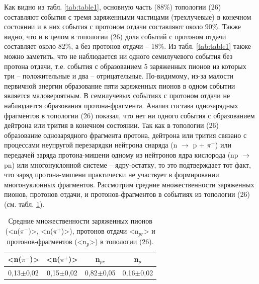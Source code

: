 \documentclass[fontsize=14pt]{scrreport}
\begin{document}
Как видно из табл. \ref{tab:table1}, основную часть (88\%) топологии (26) составляют события с тремя заряженными частицами (трехлучевые) в конечном состоянии и в них события с протоном отдачи составляют около 90\%. Также видно, что и в целом в топологии (26) доля событий с протоном отдачи составляет около 82\%, а без протонов отдачи – 18\%. Из табл. \ref{tab:table1} также можно заметить, что не наблюдается ни одного семилучевого события без протона отдачи, т.е. события с образованием 5 заряженных пионов из которых три – положительные и два – отрицательные. По-видимому, из-за малости первичной энергии образование пяти заряженных пионов в одном событии является маловероятным. В семилучевых событиях с протоном отдачи не наблюдается образования протона-фрагмента. Анализ состава однозарядных фрагментов в топологии (26) показал, что нет ни одного события с образованием дейтрона или трития в конечном состоянии. Так как в топологии (26) образование однозарядного фрагмента протона, дейтрона или трития связано с процессами неупругой перезарядки нейтрона снаряда (n $\rightarrow$ p + $\pi^{-}$) или передачей заряда протона-мишени одному из нейтронов ядра кислорода (np $\rightarrow$ pn) или многонуклонной системе – ядру-остатку, то это подтверждает тот факт, что заряд протона-мишени практически не участвует в формировании многонуклонных фрагментов\cite{44}. Рассмотрим средние множественности заряженных пионов, протонов отдачи, и протонов-фрагментов в событиях из топологии (26) (см. табл. \ref{tab:table2}).


\begin{table}
    \centering
    \begin{tabular}{|c|c|c|c|}
    \hline
       <n($\pi^{-}$)>  &<n($\pi^{+}$)> &n$_{pr}$&n$_{p}$ \\
       \hline
         0,13$\pm$0,02&	0,15$\pm$0,02&	0,82$\pm$0,05&	0,16$\pm$0,02\\
         \hline
    \end{tabular}
    \caption{Средние множественности заряженных пионов (<n($\pi^{-}$)>, <n($\pi^{+}$)>), протонов отдачи <n$_{pr}$> и протонов-фрагментов (<n$_{p}$>) в топологии (26).}
    \label{tab:table2}
\end{table}
\end{document}

